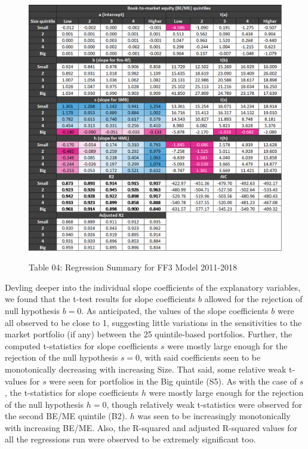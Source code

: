 \documentclass[12pt]{article}
\begin{document}
\begin{figure}[h]
	\centering
	\caption*{Table 04: Regression Summary for FF3 Model 2011-2018}
	\includegraphics[width=0.9\linewidth]{A5.png}
	\label{fig:label}
\end{figure}

\noindent Devling deeper into the individual slope coefficients of the explanatory variables, we found that the t-test results for slope coefficients $b$ allowed for the rejection of null hypothesis $b=0$. As anticipated, the values of the slope coefficients $b$ were all observed to be close to 1, suggesting little variations in the sensitivities to the market portfolio (if any) between the 25 quintile-based portfolios. Further, the computed t-statistics for slope coefficients $s$ were mostly large enough for the rejection of the null hypothesis $s=0$, with said coefficients seen to be monotonically decreasing with increasing Size. That said, some relative weak t-values for $s$ were seen for portfolios in the Big quintile (S5). As with the case of $s$, the t-statistics for slope coefficients $h$ were mostly large enough for the rejection of the null hypothesis $h=0$, though relatively weak t-statistics were observed for the second BE/ME quintile (B2). $h$ was seen to be increasingly monotonically with increasing BE/ME. Also, the R-squared and adjusted R-squared values for all the regressions run were observed to be extremely significant too.\\
\end{document}
